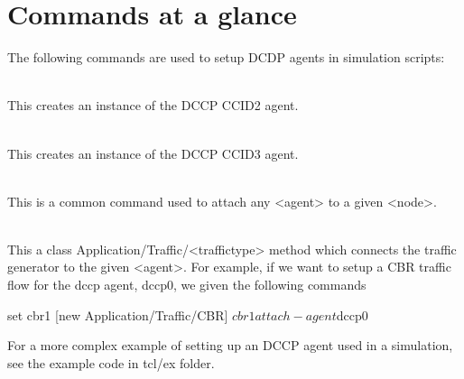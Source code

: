 \section{Commands at a glance}
\label{sec:dccpcommand}

The following commands are used to setup DCDP agents in simulation scripts:
\begin{flushleft}
\\
This creates an instance of the DCCP CCID2 agent.

\\
This creates an instance of the DCCP CCID3 agent.

\\
This is a common command used to attach any <agent> to a given <node>.

\\
This a class Application/Traffic/<traffictype> method which connects the
traffic generator to the given <agent>. For example, if we want to setup
a CBR traffic flow for the dccp agent, dccp0, we given the following commands\\
\begin{program}
set cbr1 [new Application/Traffic/CBR]
$cbr1 attach-agent $dccp0
\end{program}

For a more complex example of setting up an DCCP agent used in a simulation, see
the example code in tcl/ex folder.

\end{flushleft}

\endinput